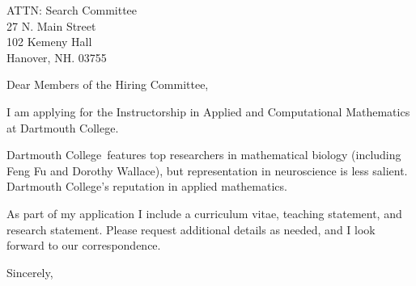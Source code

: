\documentclass[11pt,a4paper]{letter}
\begin{document}

\def\School{Dartmouth College}

\begin{letter}
{ATTN: Search Committee\\
27 N. Main Street\\
102 Kemeny Hall\\
Hanover, NH. 03755
}


\opening{Dear Members of the Hiring Committee,}

I am applying for the Instructorship in Applied and Computational Mathematics at \School. 



\School~features top researchers in mathematical biology (including Feng Fu and Dorothy Wallace), but representation in neuroscience is less salient. \School's  reputation in applied mathematics.



As part of my application I include a curriculum vitae, teaching statement, and research statement. Please request additional details as needed, and I look forward to our correspondence.

\closing{Sincerely,}
\end{letter}
\end{document}
